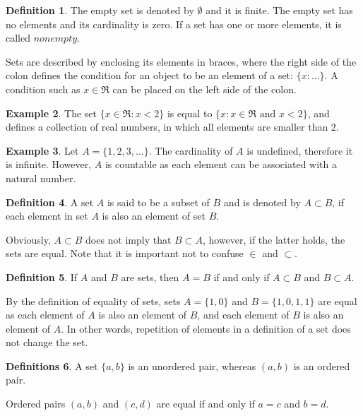 \documentclass[12pt,a4paper]{article}
\theoremstyle{definition}
\newtheorem{defn}{Definition}[section]
\newtheorem{defns}[defn]{Definitions}
\newtheorem{example}[defn]{Example}
\begin{document}
\begin{defn}
The empty set is denoted by $\emptyset$ and it is finite. The empty set has no
elements and its cardinality is zero. If a set has one or more elements, it is
called $nonempty$.
\end{defn}

Sets are described by enclosing its elements in braces, where the right side of
the colon defines the condition for an object to be an element of a set:  $\{ x
: ...  \}$. A condition such as $x \in \Re$ can be placed on the left side of
the colon.

\begin{example}
The set $\{ x \in \Re : x < 2 \}$ is equal to $\{ x : x \in \Re \text{ and } x
< 2 \}$, and defines a collection of real numbers, in which all elements are
smaller than 2.
\end{example}

\begin{example}
Let $A = \{1, 2, 3, ... \}$. The cardinality of $A$ is undefined, therefore it
is infinite. However, $A$ is countable as each element can be associated with a
natural number.
\end{example}

\begin{defn}
A set $A$ is said to be a subset of $B$ and is denoted by $A \subset B$, if
each element in set $A$ is also an element of set $B$.
\end{defn}

Obviously, $A \subset B$ does not imply that $B \subset A$, however, if the
latter holds, the sets are equal. Note that it is important not to confuse
$\in$ and $\subset$. 

\begin{defn}
If $A$ and $B$ are sets, then $A = B$ if and only if $A \subset B$ and $B
\subset A$.
\end{defn}

By the definition of equality of sets, sets $A = \{1, 0\}$ and $B = \{1, 0, 1,
1\}$ are equal as each element of $A$ is also an element of $B$, and each
element of $B$ is also an element of $A$. In other words, repetition of
elements in a definition of a set does not change the set.

\begin{defns} 
A set $\{a, b\}$ is an unordered pair, whereas $(a, b)$ is an ordered pair.

Ordered pairs $(a, b)$ and $(c, d)$ are equal if and only if $a = c$ and $b =
d$.
\end{defns}
\end{document}
